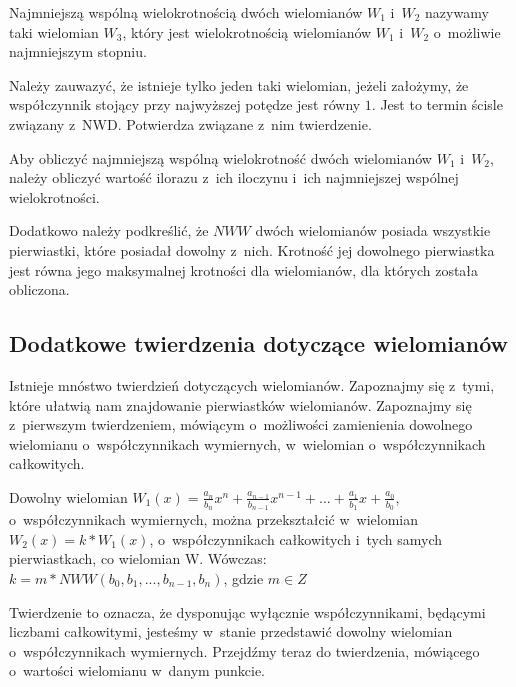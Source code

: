 \begin{definition}
	$ $\\
	Najmniejszą wspólną wielokrotnością dwóch wielomianów $W_1$ i~$W_2$ nazywamy taki wielomian $W_3$, który jest wielokrotnością wielomianów $W_1$ i~$W_2$ o~możliwie najmniejszym stopniu.
\end{definition}

Należy zauwazyć, że istnieje tylko jeden taki wielomian, jeżeli założymy, że współczynnik stojący przy najwyższej potędze jest równy $1$. Jest to termin ścisle związany z~NWD. Potwierdza związane z~nim twierdzenie.

\begin{theorem}
	Aby obliczyć najmniejszą wspólną wielokrotność dwóch wielomianów $W_1$ i~$W_2$, należy obliczyć wartość ilorazu z~ich iloczynu i~ich najmniejszej wspólnej wielokrotności.
\end{theorem}

Dodatkowo należy podkreślić, że $NWW$ dwóch wielomianów posiada wszystkie pierwiastki, które posiadał dowolny z~nich. Krotność jej dowolnego pierwiastka jest równa jego maksymalnej krotności dla wielomianów, dla których została obliczona.

\subsection{Dodatkowe twierdzenia dotyczące wielomianów}

Istnieje mnóstwo twierdzień dotyczących wielomianów. Zapoznajmy się z~tymi, które ułatwią nam znajdowanie pierwiastków wielomianów. Zapoznajmy się z~pierwszym twierdzeniem, mówiącym o~możliwości zamienienia dowolnego wielomianu o~współczynnikach wymiernych, w~wielomian o~współczynnikach całkowitych.

\begin{theorem}
	$ $\\
	Dowolny wielomian $W_1(x) = \frac{a_n}{b_n}x^n + \frac{a_{n-1}}{b_{n-1}}x^{n-1} + ... + \frac{a_1}{b_1}x + \frac{a_0}{b_0}$, o~współczynnikach wymiernych, można przekształcić w~wielomian $W_2(x) = k * W_1(x)$, o~współczynnikach całkowitych i~tych samych pierwiastkach, co wielomian W. Wówczas: \\
	$k = m * NWW(b_0, b_1, ..., b_{n-1}, b_n)$, gdzie $m\in Z$
\end{theorem}

Twierdzenie to oznacza, że dysponując wyłącznie współczynnikami, będącymi liczbami całkowitymi, jesteśmy w~stanie przedstawić dowolny wielomian o~współczynnikach wymiernych. Przejdźmy teraz do twierdzenia, mówiącego o~wartości wielomianu w~danym punkcie.

